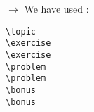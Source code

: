 \documentclass[12pt]{article}
\newcommand\codeused{
		\noindent $\rightarrow$ We have used :
	}
\begin{document}
\topic
\exercise
\exercise
\problem
\problem
\bonus
\bonus


\codeused{}

\begin{verbatim}
\topic
\exercise
\exercise
\problem
\problem
\bonus
\bonus
\end{verbatim}
\end{document}
